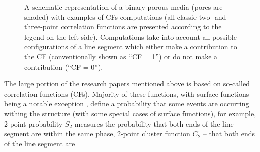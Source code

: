 \documentclass[reprint,amsmath,amssymb,aps,pre,showkeys,showpacs]{revtex4-1}
\begin{document}
\begin{figure}[ht]
  \centering
  \hfill
  \caption[]{A schematic representation of a binary porous media (pores are
    shaded) with examples of CFs computations (all classic two- and three-point
    correlation functions are presented according to the legend on the left
    side). Computations take into account all possible configurations of a line
    segment which either make a contribution to the CF (conventionally shown as
    ``CF = 1'') or do not make a contribution (``CF = 0'').}
  \label{fig:3point-scheme}
\end{figure}
The large portion of the research papers mentioned above
\cite{rozenbaum2014,karsanina2015,ledesma2018,derossi2019,portillo2018developing,
  takada2003three,hopkins2013stars,jiao2013,Torquato_book,roding2020predicting,
  KarsaninaEJSS,capek2009,gerke2019tensor,REVpaper,LavrukhinPRE,Adler_recon,Y-T,
  tahmasebiPRL,Euras2012,EPL2,karsaninaPRL,jiao2007,SciRep1,Havelka,Geoderma2018}
is based on so-called correlation functions (CFs). Majority of these functions, with 
surface functions being a notable exception \cite{samarin2023robust}, define a
probability that some events are occurring withing the structure (with some
special cases of surface functions), for example, 2-point probability $S_2$
measures the probability that both ends of the line segment are within the same
phase, 2-point cluster function $C_2$ -- that both ends of the line segment are
\end{document}

